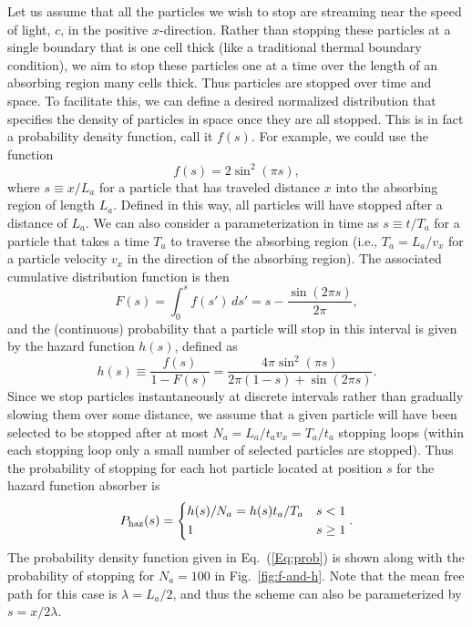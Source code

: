 \documentclass[../absorber.tex]{subfiles}
\begin{document}
Let us assume that all the particles we wish to stop are streaming near the speed of light, $c$, in the positive $x$-direction.  Rather than stopping these particles at a single boundary that is one cell thick (like a traditional thermal boundary condition), we aim to stop these particles one at a time over the length of an absorbing region many cells thick.  Thus particles are stopped over time and space.  To facilitate this, we can define a desired normalized distribution that specifies the density of particles in space once they are all stopped.  This is in fact a probability density function, call it $f(s)$.  For example, we could use the function
\begin{equation} \label{Eq:prob}
    f(s) = 2\sin^2(\pi s),
\end{equation}
where $s \equiv x/L_a$ for a particle that has traveled distance $x$ into the absorbing region of length $L_a$.  Defined in this way, all particles will have stopped after a distance of $L_a$.  We can also consider a parameterization in time as $s \equiv t/T_a$ for a particle that takes a time $T_a$ to traverse the absorbing region (i.e., $T_a=L_a/v_x$ for a particle velocity $v_x$ in the direction of the absorbing region).  The associated cumulative distribution function is then
\begin{equation}
    F(s) = \int_0^s f(s')\,ds' = s - \frac{\sin ( 2 \pi s )}{2\pi},
\end{equation}
and the (continuous) probability that a particle will stop in this interval is given by the hazard function $h(s)$, defined as\cite{Evans2000TermsSymbols}
\begin{equation} \label{Eq:hazard}
    h(s) \equiv \frac{f(s)}{1-F(s)} = \frac{4\pi \sin^2 ( \pi s )}{2\pi ( 1-s ) + \sin ( 2 \pi s )}.
\end{equation}
Since we stop particles instantaneously at discrete intervals rather than gradually slowing them over some distance, we assume that a given particle will have been selected to be stopped after at most $N_a=L_a/t_av_x=T_a/t_a$ stopping loops (within each stopping loop only a small number of selected particles are stopped). Thus the probability of stopping for each hot particle located at position $s$ for the hazard function absorber is
\begin{equation} \label{Eq:P-haz}
    P_\mathrm{haz}(s) = \begin{dcases} 
      h(s)/N_a = h(s)t_a/T_a & s < 1 \\
      1 & s \geq 1
   \end{dcases}.
\end{equation}
The probability density function given in Eq.~(\ref{Eq:prob}) is shown along with the probability of stopping for $N_a=100$ in Fig.~\ref{fig:f-and-h}.  Note that the mean free path for this case is $\lambda=L_a/2$, and thus the scheme can also be parameterized by $s=x/2\lambda$.
\end{document}
